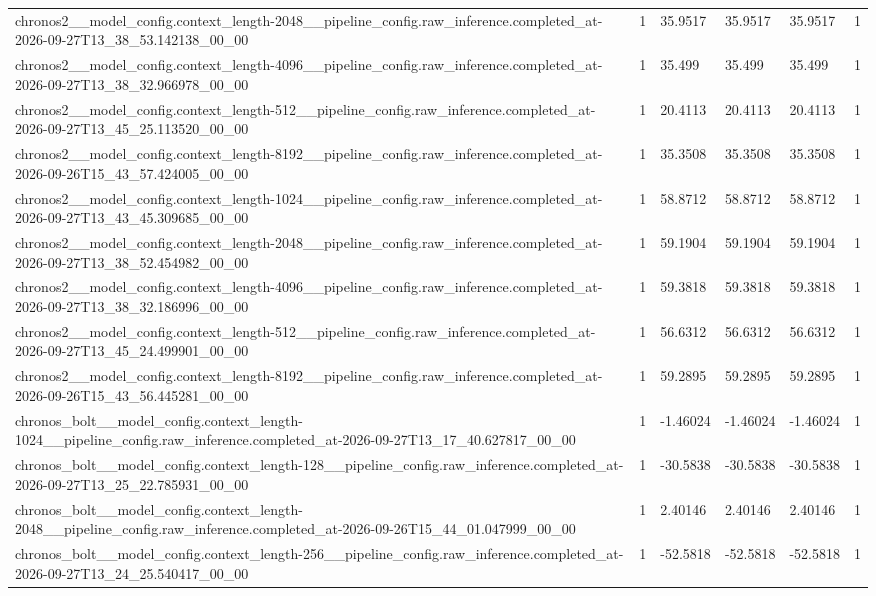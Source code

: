 \begin{tabular}{llllll}
chronos2\_\_model\_config.context\_length-2048\_\_pipeline\_config.raw\_inference.completed\_at-2026-09-27T13\_38\_53.142138\_00\_00 & 1 & 35.9517 & 35.9517 & 35.9517 & 1 \\
chronos2\_\_model\_config.context\_length-4096\_\_pipeline\_config.raw\_inference.completed\_at-2026-09-27T13\_38\_32.966978\_00\_00 & 1 & 35.499 & 35.499 & 35.499 & 1 \\
chronos2\_\_model\_config.context\_length-512\_\_pipeline\_config.raw\_inference.completed\_at-2026-09-27T13\_45\_25.113520\_00\_00 & 1 & 20.4113 & 20.4113 & 20.4113 & 1 \\
chronos2\_\_model\_config.context\_length-8192\_\_pipeline\_config.raw\_inference.completed\_at-2026-09-26T15\_43\_57.424005\_00\_00 & 1 & 35.3508 & 35.3508 & 35.3508 & 1 \\
chronos2\_\_model\_config.context\_length-1024\_\_pipeline\_config.raw\_inference.completed\_at-2026-09-27T13\_43\_45.309685\_00\_00 & 1 & 58.8712 & 58.8712 & 58.8712 & 1 \\
chronos2\_\_model\_config.context\_length-2048\_\_pipeline\_config.raw\_inference.completed\_at-2026-09-27T13\_38\_52.454982\_00\_00 & 1 & 59.1904 & 59.1904 & 59.1904 & 1 \\
chronos2\_\_model\_config.context\_length-4096\_\_pipeline\_config.raw\_inference.completed\_at-2026-09-27T13\_38\_32.186996\_00\_00 & 1 & 59.3818 & 59.3818 & 59.3818 & 1 \\
chronos2\_\_model\_config.context\_length-512\_\_pipeline\_config.raw\_inference.completed\_at-2026-09-27T13\_45\_24.499901\_00\_00 & 1 & 56.6312 & 56.6312 & 56.6312 & 1 \\
chronos2\_\_model\_config.context\_length-8192\_\_pipeline\_config.raw\_inference.completed\_at-2026-09-26T15\_43\_56.445281\_00\_00 & 1 & 59.2895 & 59.2895 & 59.2895 & 1 \\
chronos\_bolt\_\_model\_config.context\_length-1024\_\_pipeline\_config.raw\_inference.completed\_at-2026-09-27T13\_17\_40.627817\_00\_00 & 1 & -1.46024 & -1.46024 & -1.46024 & 1 \\
chronos\_bolt\_\_model\_config.context\_length-128\_\_pipeline\_config.raw\_inference.completed\_at-2026-09-27T13\_25\_22.785931\_00\_00 & 1 & -30.5838 & -30.5838 & -30.5838 & 1 \\
chronos\_bolt\_\_model\_config.context\_length-2048\_\_pipeline\_config.raw\_inference.completed\_at-2026-09-26T15\_44\_01.047999\_00\_00 & 1 & 2.40146 & 2.40146 & 2.40146 & 1 \\
chronos\_bolt\_\_model\_config.context\_length-256\_\_pipeline\_config.raw\_inference.completed\_at-2026-09-27T13\_24\_25.540417\_00\_00 & 1 & -52.5818 & -52.5818 & -52.5818 & 1 \\

\end{tabular}

